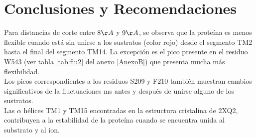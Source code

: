 \chapter{Conclusiones y Recomendaciones}\label{ch:5}
Para distancias de corte entre $8\AA$ y $9\AA$, se observa que la prote\'{i}na  es menos flexible cuando est\'{a} sin unirse a los sustratos (color rojo) desde el segmento TM2 hasta el final del segmento TM14. La excepci\'{o}n es el pico presente en el residuo W543 (ver tabla \ref{tab:flu2} del anexo \ref{AnexoB}) que presenta mucha m\'{a}s flexibilidad.\\

Los picos correspondientes a los residuos S209 y F210 tambi\'{e}n muestran cambios significativos de la fluctuaciones ms antes y despu\'{e}s de unirse alguno de los sustratos.\\

Las $\alpha$ h\'{e}lices TM1 y TM15 encontradas en la estructura cristalina de 2XQ2, contribuyen a la estabilidad de la prote\'{i}na cuando se encuentra unida al substrato y al ion.\\
